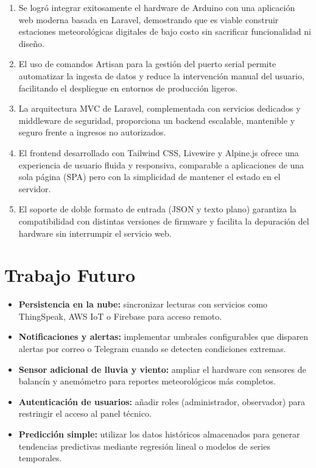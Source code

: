 \documentclass[12pt,a4paper]{report}
\begin{document}
\begin{enumerate}[leftmargin=*]
    \item Se logró integrar exitosamente el hardware de Arduino con una aplicación web moderna basada en Laravel, demostrando que es viable construir estaciones meteorológicas digitales de bajo costo sin sacrificar funcionalidad ni diseño.
    
    \item El uso de comandos Artisan para la gestión del puerto serial permite automatizar la ingesta de datos y reduce la intervención manual del usuario, facilitando el despliegue en entornos de producción ligeros.
    
    \item La arquitectura MVC de Laravel, complementada con servicios dedicados y middleware de seguridad, proporciona un backend escalable, mantenible y seguro frente a ingresos no autorizados.
    
    \item El frontend desarrollado con Tailwind CSS, Livewire y Alpine.js ofrece una experiencia de usuario fluida y responsiva, comparable a aplicaciones de una sola página (SPA) pero con la simplicidad de mantener el estado en el servidor.
    
    \item El soporte de doble formato de entrada (JSON y texto plano) garantiza la compatibilidad con distintas versiones de firmware y facilita la depuración del hardware sin interrumpir el servicio web.
\end{enumerate}

\chapter{Trabajo Futuro}
\label{ch:trabajo-futuro}

\begin{itemize}[leftmargin=*]
    \item \textbf{Persistencia en la nube:} sincronizar lecturas con servicios como ThingSpeak, AWS IoT o Firebase para acceso remoto.
    \item \textbf{Notificaciones y alertas:} implementar umbrales configurables que disparen alertas por correo o Telegram cuando se detecten condiciones extremas.
    \item \textbf{Sensor adicional de lluvia y viento:} ampliar el hardware con sensores de balancín y anemómetro para reportes meteorológicos más completos.
    \item \textbf{Autenticación de usuarios:} añadir roles (administrador, observador) para restringir el acceso al panel técnico.
    \item \textbf{Predicción simple:} utilizar los datos históricos almacenados para generar tendencias predictivas mediante regresión lineal o modelos de series temporales.
\end{itemize}



\end{document}
